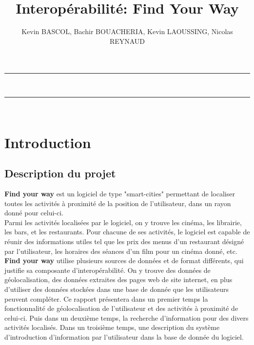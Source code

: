 \documentclass[10pt,a4paper]{report}
\author{Kevin BASCOL, Bachir BOUACHERIA, Kevin LAOUSSING, Nicolas REYNAUD}
\title{ Interopérabilité: Find Your Way}
\begin{document}
\makeatletter
	\begin{titlepage}
	
	\centering
		{
		\vspace*{5cm}
		\hrule height 2pt
		\vspace{0.7cm}
		\Huge \textbf{\@title}}\\
		\vspace{0.7cm}
		\hrule height 2pt
		
		\vfill
		\vspace{1cm}
		\@author\\
		\end{titlepage}
\makeatother
\setcounter{secnumdepth}{4}
\setcounter{tocdepth}{3}
\renewcommand{\contentsname}{Sommaire}
\begingroup\makeatletter
\def\@makeschapterhead#1{%
  {\parindent \z@ \raggedright
    \normalfont
    \interlinepenalty\@M
    \Huge \bfseries  #1\par\nobreak
    \vskip 20pt%
  }}\makeatother
\tableofcontents
\endgroup
\thispagestyle{empty}
\setcounter{page}{0}
\newpage


\section{Introduction}

\subsection{Description du projet}
\begin{flushleft}
\textbf{Find your way} est un logiciel de type "smart-cities" permettant de localiser toutes les activités à proximité de la position de l'utilisateur, dans un rayon donné pour celui-ci.\\
Parmi les activités localisées par le logiciel, on y trouve les cinéma, les librairie, les bars, et les restaurants. Pour chacune de ses activités, le logiciel est capable de réunir des informations utiles tel que les prix des menus d'un restaurant désigné par l'utilisateur, les horaires des séances d'un film pour un cinéma donné, etc.
\textbf{Find your way} utilise plusieurs sources de données et de format différents, qui justifie sa composante d'interopérabilité. On y trouve des données de géolocalisation, des données extraites des pages web de site internet, en plus d'utiliser des données stockées dans une base de donnée que les utilisateurs peuvent compléter.
Ce rapport présentera dans un premier temps la fonctionnalité de géolocalisation de l'utilisateur et des activités à proximité de celui-ci. Puis dans un deuxième temps, la recherche d'information pour des divers activités localisés. Dans un troisième temps, une description du système d'introduction d'information par l'utilisateur dans la base de donnée du logiciel.

\end{flushleft}
\end{document}
